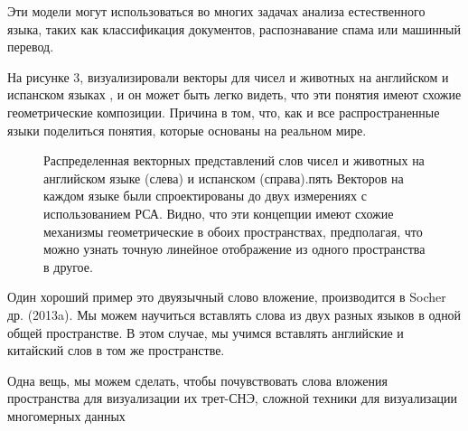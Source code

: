 \documentclass[12pt]{article}
\begin{document}
Эти модели могут использоваться во многих задачах анализа естественного языка, таких как классификация документов, распознавание спама или машинный перевод.

На рисунке 3, визуализировали векторы для чисел и животных на английском и испанском языках \cite{Le}, и он может быть легко видеть, что эти понятия имеют схожие геометрические композиции. Причина в том, что, как и все распространенные языки поделиться понятия, которые основаны на реальном мире.
	\begin{figure}[H]
		\noindent{}
		\caption{Распределенная векторных представлений слов чисел и животных на английском языке (слева) и испанском (справа).пять Векторов на каждом языке были спроектированы до двух измерениях с использованием РСА. Видно, что эти концепции имеют схожие механизмы геометрические в обоих пространствах, предполагая, что можно узнать точную линейное отображение из одного пространства в другое.}
		\label{figCurves}
	\end{figure}

Один хороший пример это двуязычный слово вложение, производится в Socher др. (2013a)\cite{Zou}. Мы можем научиться вставлять слова из двух разных языков в одной общей пространстве. В этом случае, мы учимся вставлять английские и китайский слов в том же пространстве.

Одна вещь, мы можем сделать, чтобы почувствовать слова вложения пространства для визуализации их трет-СНЭ, сложной техники для визуализации многомерных данных
\end{document}

